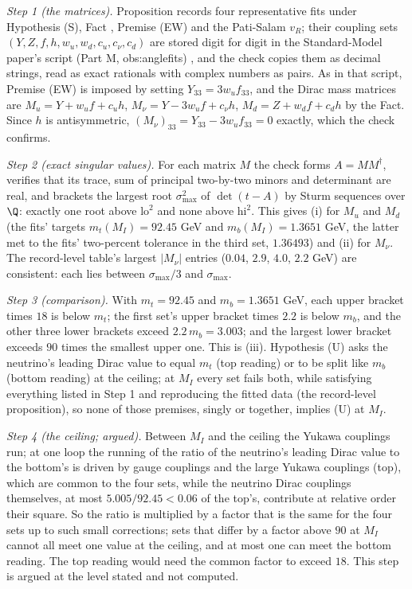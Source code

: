 \emph{Step 1 (the matrices).} Proposition  records four representative fits under Hypothesis (S), Fact , Premise (EW) and the Pati-Salam $v_{R}$; their coupling sets $(Y, Z, f, h, w_{u}, w_{d}, c_{u}, c_{\nu}, c_{d})$ are stored digit for digit in the Standard-Model paper's script (Part M, obs:anglefits) \cite{ButlerT12}, and the check copies them as decimal strings, read as exact rationals with complex numbers as pairs. As in that script, Premise (EW) is imposed by setting $Y_{33} = 3w_{u}f_{33}$, and the Dirac mass matrices are $M_{u} = Y + w_{u}f + c_{u}h$, $M_{\nu} = Y - 3w_{u}f + c_{\nu}h$, $M_{d} = Z + w_{d}f + c_{d}h$ by the Fact. Since $h$ is antisymmetric, $(M_{\nu})_{33} = Y_{33} - 3w_{u}f_{33} = 0$ exactly, which the check confirms.

\emph{Step 2 (exact singular values).} For each matrix $M$ the check forms $A = MM^{\dagger}$, verifies that its trace, sum of principal two-by-two minors and determinant are real, and brackets the largest root $\sigma_{\max}^{2}$ of $\det(t - A)$ by Sturm sequences over $\Q$: exactly one root above $\mathrm{lo}^{2}$ and none above $\mathrm{hi}^{2}$. This gives (i) for $M_{u}$ and $M_{d}$ (the fits' targets $m_{t}(M_{I}) = 92.45$ GeV and $m_{b}(M_{I}) = 1.3651$ GeV, the latter met to the fits' two-percent tolerance in the third set, $1.36493$) and (ii) for $M_{\nu}$. The record-level table's largest $|M_{\nu}|$ entries ($0.04$, $2.9$, $4.0$, $2.2$ GeV) are consistent: each lies between $\sigma_{\max}/3$ and $\sigma_{\max}$.

\emph{Step 3 (comparison).} With $m_{t} = 92.45$ and $m_{b} = 1.3651$ GeV, each upper bracket times $18$ is below $m_{t}$; the first set's upper bracket times $2.2$ is below $m_{b}$, and the other three lower brackets exceed $2.2\,m_{b} = 3.003$; and the largest lower bracket exceeds $90$ times the smallest upper one. This is (iii). Hypothesis (U) asks the neutrino's leading Dirac value to equal $m_{t}$ (top reading) or to be split like $m_{b}$ (bottom reading) at the ceiling; at $M_{I}$ every set fails both, while satisfying everything listed in Step 1 and reproducing the fitted data (the record-level proposition), so none of those premises, singly or together, implies (U) at $M_{I}$.

\emph{Step 4 (the ceiling; argued).} Between $M_{I}$ and the ceiling the Yukawa couplings run; at one loop the running of the ratio of the neutrino's leading Dirac value to the bottom's is driven by gauge couplings and the large Yukawa couplings (top), which are common to the four sets, while the neutrino Dirac couplings themselves, at most $5.005/92.45 < 0.06$ of the top's, contribute at relative order their square. So the ratio is multiplied by a factor that is the same for the four sets up to such small corrections; sets that differ by a factor above $90$ at $M_{I}$ cannot all meet one value at the ceiling, and at most one can meet the bottom reading. The top reading would need the common factor to exceed $18$. This step is argued at the level stated and not computed.

